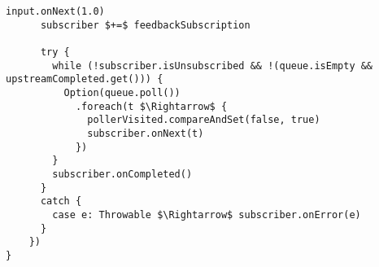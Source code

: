 \begin{lstlisting}[style=ScalaStyle, caption={Implementation of \code{BackpressureObservable}}]
      input.onNext(1.0)
      subscriber $+=$ feedbackSubscription

      try {
        while (!subscriber.isUnsubscribed && !(queue.isEmpty && upstreamCompleted.get())) {
          Option(queue.poll())
            .foreach(t $\Rightarrow$ {
              pollerVisited.compareAndSet(false, true)
              subscriber.onNext(t)
            })
        }
        subscriber.onCompleted()
      }
      catch {
        case e: Throwable $\Rightarrow$ subscriber.onError(e)
      }
    })
}
\end{lstlisting}
